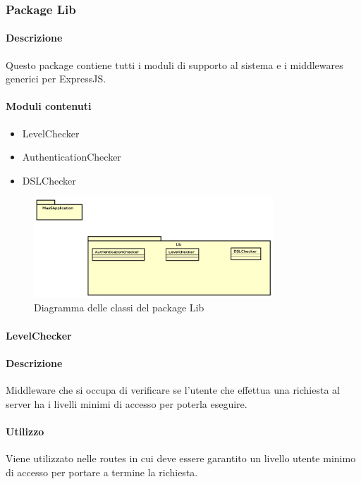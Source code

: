\subsubsection{Package Lib}
\paragraph*{Descrizione}
Questo package contiene tutti i moduli di supporto al sistema e i middlewares generici per ExpressJS.

\paragraph*{Moduli contenuti}
\begin{itemize}
\item LevelChecker
\item AuthenticationChecker
\item DSLChecker
\end{itemize}


\begin{figure}[H]
\centering
\includegraphics[width=0.8\textwidth]{res/sections/backend/lib.png}
\caption{Diagramma delle classi del package Lib}
\end{figure}

\paragraph{LevelChecker}
\paragraph*{Descrizione}
Middleware che si occupa di verificare se l'utente che effettua una richiesta al server ha i livelli minimi di accesso per poterla eseguire.

\paragraph*{Utilizzo}
Viene utilizzato nelle routes in cui deve essere garantito un livello utente minimo di accesso per portare a termine la richiesta.

